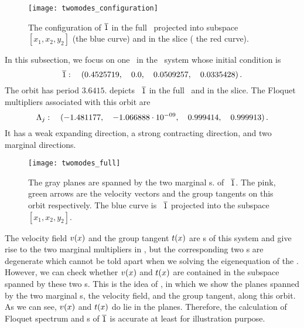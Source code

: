 \begin{figure}[h]
  \centering
  \texttt{[image: twomodes\_configuration]}
  \caption[A \rpo\ in the \twomode\ system.]
  {
    The configuration of ${\overline{1}}$ in the full \statesp\ projected
    into subspace $[x_{1},x_{2},y_{2}]$ (the blue curve) and in the slice (
    the red curve).
  }
  \label{fig:twomodes_configuration}
\end{figure}
In this subsection, we focus on one \rpo\ in the \twomode\ system
whose initial condition is
\begin{equation}
  \label{eq:2modeInit1}
  {\ensuremath{\overline{1}}}: \quad (0.4525719,\quad 0.0,\quad 0.0509257,\quad 0.0335428)
  \,.
\end{equation}
The orbit has period $3.6415$.
 depicts \rpo\
${\overline{1}}$ in the full \statesp\ and in the slice.
The Floquet multipliers associated with this orbit are
\begin{equation}
  \label{eq:2modeMulti1}
  \Lambda_{j} : \quad (-1.481177, \quad
  -1.066888\cdot 10^{-09},\quad  0.999414,\quad  0.999913)
  \,.
\end{equation}
It has a weak expanding direction, a strong
contracting direction, and two marginal directions.

\begin{figure}[h]
  \centering
  \texttt{[image: twomodes\_full]}
  \caption[Marginal \Fv s in the \twomode\ system.]{
    The gray planes are spanned by the two marginal \Fv s.
    of \rpo\ ${\overline{1}}$.
    The pink, green arrows are the velocity vectors and the group
    tangents on this orbit respectively.
    The blue curve is \rpo\ ${\overline{1}}$ projected into the
    subspace $[x_{1},x_{2},y_{2}]$.
  }
  \label{fig:twomodes_full}
\end{figure}
The velocity field $v(x)$ and the group tangent $t(x)$
are \Fv s of this system and give rise to the two
marginal multipliers in , but the corresponding
two \Fv s are degenerate which cannot be told apart when we solving the
eigenequation of the \JacobianM. However, we can check whether $v(x)$
and $t(x)$ are contained in the subspace spanned by
these two \Fv s. This is the idea of ,
in which we show the planes spanned by the two marginal \Fv s, the velocity field,
and the group tangent, along this orbit.
As we can see, $v(x)$ and $t(x)$ do lie in the planes.
Therefore, the calculation of Floquet spectrum and \Fv s
of ${\overline{1}}$ is accurate at least for illustration purpose.

